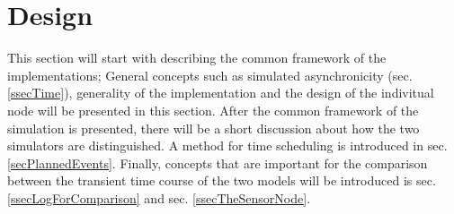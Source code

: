%
%
%






\section{Design} %
	\label{secDesignForANN}

	This section will start with describing the common framework of the implementations; 
		General concepts such as simulated asynchronicity (sec.\ref{ssecTime}), generality of the implementation and the design of the indivitual node will be presented in this section. %
	After the common framework of the simulation is presented, there will be a short discussion about how the two simulators are distinguished. %
	A method for time scheduling is introduced in sec. \ref{secPlannedEvents}.
	Finally, concepts that are important for the comparison between the transient time course of the two models will be introduced is sec. \ref{ssecLogForComparison} and sec. \ref{ssecTheSensorNode}.
	
